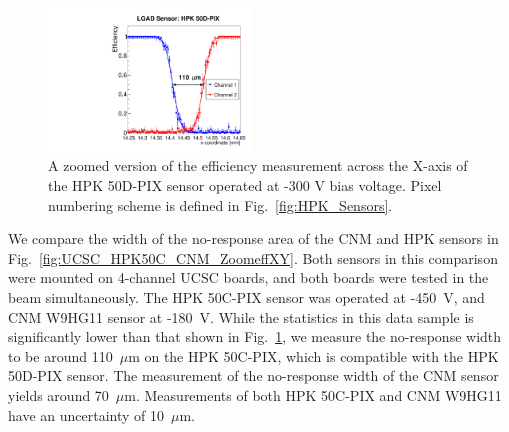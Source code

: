 \documentclass[preprint,1p]{elsarticle}
\begin{document}
\begin{figure}[!htbp] 
\centering
\includegraphics[width=0.48\textwidth]{figs/KUBoard_HPK50DPix_Run638-781/Eff_vs_X_HPK50DPIX_Ch1_2_fit.pdf} 
\caption{A zoomed version of the efficiency measurement across the X-axis of the HPK 50D-PIX sensor operated at -300 V bias voltage. Pixel numbering scheme is defined in Fig.~\ref{fig:HPK_Sensors}.} 
\label{fig:FNAL_HPK50_ZoomeffXY} 
\end{figure} 

We compare the width of the no-response area of the CNM and HPK sensors in
Fig.~\ref{fig:UCSC_HPK50C_CNM_ZoomeffXY}. Both sensors in this comparison were
mounted on 4-channel UCSC boards, and both boards were tested in the beam
simultaneously. The HPK 50C-PIX sensor was operated at -450~V, and CNM W9HG11
sensor at -180~V. While the statistics in this data sample is significantly
lower than that shown in Fig.~\ref{fig:FNAL_HPK50_ZoomeffXY}, we measure the
no-response width to be around 110~$\mu$m on the HPK 50C-PIX, which is
compatible with the HPK 50D-PIX sensor. The measurement of the no-response width
of the CNM sensor yields around 70~$\mu$m. Measurements of both HPK 50C-PIX and
CNM W9HG11 have an uncertainty of 10~$\mu$m.
\end{document}
